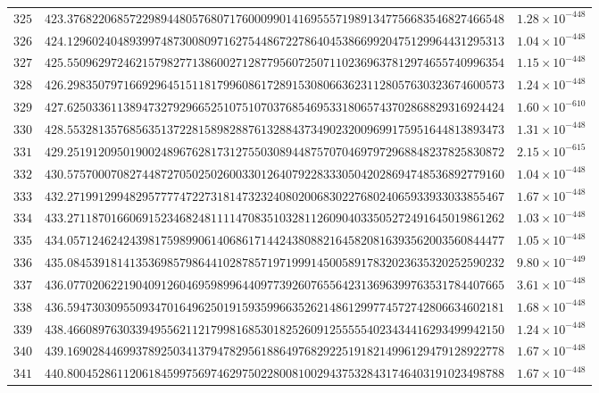 \documentclass[12pt,reqno]{amsart}
\theoremstyle{remark}
\begin{document}
\begin{longtable}{clc}
$325$ & $423.3768220685722989448057680717600099014169555719891347756683546827466548$ & $1.28\times 10^{-448}$ \\
$326$ & $424.1296024048939974873008097162754486722786404538669920475129964431295313$ & $1.04\times 10^{-448}$ \\
$327$ & $425.5509629724621579827713860027128779560725071102369637812974655740996354$ & $1.15\times 10^{-448}$ \\
$328$ & $426.2983507971669296451511817996086172891530806636231128057630323674600573$ & $1.24\times 10^{-448}$ \\
$329$ & $427.6250336113894732792966525107510703768546953318065743702868829316924424$ & $1.60\times 10^{-610}$ \\
$330$ & $428.5532813576856351372281589828876132884373490232009699175951644813893473$ & $1.31\times 10^{-448}$ \\
$331$ & $429.2519120950190024896762817312755030894487570704697972968848237825830872$ & $2.15\times 10^{-615}$ \\
$332$ & $430.5757000708274487270502502600330126407922833305042028694748536892779160$ & $1.04\times 10^{-448}$ \\
$333$ & $432.2719912994829577774722731814732324080200683022768024065933933033855467$ & $1.67\times 10^{-448}$ \\
$334$ & $433.2711870166069152346824811114708351032811260904033505272491645019861262$ & $1.03\times 10^{-448}$ \\
$335$ & $434.0571246242439817598990614068617144243808821645820816393562003560844477$ & $1.05\times 10^{-448}$ \\
$336$ & $435.0845391814135369857986441028785719719991450058917832023635320252590232$ & $9.80\times 10^{-449}$ \\
$337$ & $436.0770206221904091260469598996440977392607655642313696399763531784407665$ & $3.61\times 10^{-448}$ \\
$338$ & $436.5947303095509347016496250191593599663526214861299774572742806634602181$ & $1.68\times 10^{-448}$ \\
$339$ & $438.4660897630339495562112179981685301825260912555554023434416293499942150$ & $1.24\times 10^{-448}$ \\
$340$ & $439.1690284469937892503413794782956188649768292251918214996129479128922778$ & $1.67\times 10^{-448}$ \\
$341$ & $440.8004528611206184599756974629750228008100294375328431746403191023498788$ & $1.67\times 10^{-448}$ \\

\end{longtable}
\end{document}
